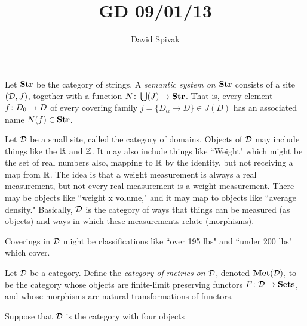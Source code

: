 \documentclass{amsart}
\def\Met{{\bf Met}}
\def\Str{{\bf Str}}
\begin{document}
\title{GD 09/01/13}

\author{David Spivak}

\maketitle

\begin{definition}

Let $\Str$ be the category of strings.  A {\em semantic system on $\Str$} consists of a site $(\mathcal{D},J)$, together with a function $N\taking \bigcup(J)\to\Str$.  That is, every element $f\colon D_0\rightarrow D$ of every covering family $j=\{D_\alpha\to D\}\in J(D)$ has an associated name $N(f)\in\Str$.

\end{definition}

Let $\mathcal{D}$ be a small site, called the category of domains.  Objects of $\mathcal{D}$ may include things like the ${\mathbb R}$ and ${\mathbb Z}$.  It may also include things like ``Weight" which might be the set of real numbers also, mapping to ${\mathbb R}$ by the identity, but not receiving a map from ${\mathbb R}$.  The idea is that a weight measurement is always a real measurement, but not every real measurement is a weight measurement.  There may be objects like ``weight x volume," and it may map to objects like ``average density."  Basically, $\mathcal{D}$ is the category of ways that things can be measured (as objects) and ways in which these measurements relate (morphisms).

Coverings in $\mathcal{D}$ might be classifications like ``over 195 lbs" and ``under 200 lbs" which cover.  

\begin{definition}

Let $\mathcal{D}$ be a category.  Define the {\em category of metrics on $\mathcal{D}$}, denoted $\Met(\mcD)$, to be the category whose objects are finite-limit preserving functors $F\colon\mathcal{D}\rightarrow{\bf Sets}$, and whose morphisms are natural transformations of functors.

\end{definition}

\begin{example}

Suppose that $\mathcal{D}$ is the category with four objects

\end{example}
\end{document}
